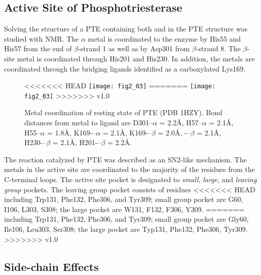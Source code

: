 \begin{refsection}
\subsection{Active Site of Phosphotriesterase}

Solving the structure of a PTE containing both  and
 in the PTE structure was studied with NMR\cite{Benning2001a}. The
$\alpha$ metal is coordinated to the enzyme by His55 and His57 from the
end of $\beta$-strand 1 as well as by Asp301 from $\beta$-strand 8. The
$\beta$-site metal is coordinated through His201 and His230. In addition, the
metals are coordinated through the bridging ligands identified as a
carboxylated Lys169.

\begin{figure}[h!] 
    \centering 
<<<<<<< HEAD
    \texttt{[image: fig2\_03]}
=======
    \texttt{[image: fig2\_03]}
>>>>>>> v1.0
    \caption[Metal
        coordination of resting state of PTE (PDB 1HZY). Bond distances from
        metal to ligand are D301--$\alpha$ = 2.2\AA, H57--$\alpha$ = 2.1\AA,
        H55--$\alpha$ = 1.8\AA, K169-–$\alpha$ = 2.1\AA, K169-–$\beta$ =
        2.0\AA, -–$\beta$ = 2.1\AA, H230-–$\beta$ = 2.1\AA,
    H201-–$\beta$ = 2.2\AA.]{Metal coordination of resting state of PTE (PDB
        1HZY). Bond distances from metal to ligand are D301--$\alpha$ = 2.2\AA,
        H57--$\alpha$ = 2.1\AA, H55--$\alpha$ = 1.8\AA, K169-–$\alpha$ =
        2.1\AA, K169-–$\beta$ = 2.0\AA,
    -–$\beta$ = 2.1\AA, H230-–$\beta$ = 2.1\AA, H201-–$\beta$ = 2.2\AA.} 
    \label{fig:pte-active-site-chap2}
\end{figure}

The reaction catalyzed by PTE was described as an SN2-like mechanism. The metals in the
active site are coordinated to the majority of the residues from the C-terminal
loops. The active site pocket is designated to \emph{small}, \emph{large}, and
\emph{leaving group} pockets. The leaving group pocket consists of residues
<<<<<<< HEAD
including Trp131, Phe132, Phe306, and Tyr309; small group pocket are G60, I106,
L303, S308; the large pocket are W131, F132, F306, Y309.
=======
including Trp131, Phe132, Phe306, and Tyr309; small group pocket are Gly60, Ile106,
Leu303, Ser308; the large pocket are Typ131, Phe132, Phe306, Tyr309.
>>>>>>> v1.0

\subsection{Side-chain Effects}
\label{sec:side-chain}


\end{refsection}

